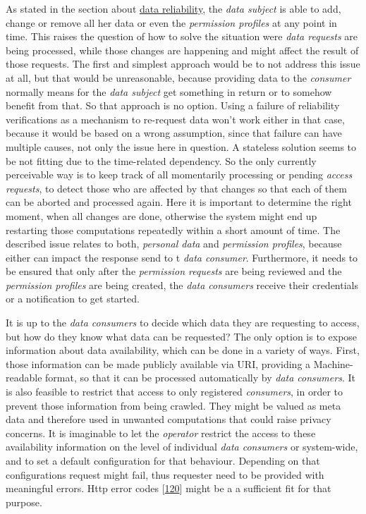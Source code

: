 \documentclass[12pt,english,a4paper,titlepage,cleardoublepage=empty,dottedtoc]{report}
\begin{document}
As stated in the section about \protect\hyperlink{data-reliability}{data
reliability}, the \emph{data subject} is able to add, change or remove
all her data or even the \emph{permission profiles} at any point in
time. This raises the question of how to solve the situation were
\emph{data requests} are being processed, while those changes are
happening and might affect the result of those requests. The first and
simplest approach would be to not address this issue at all, but that
would be unreasonable, because providing data to the \emph{consumer}
normally means for the \emph{data subject} get something in return or to
somehow benefit from that. So that approach is no option. Using a
failure of reliability verifications as a mechanism to re-request data
won't work either in that case, because it would be based on a wrong
assumption, since that failure can have multiple causes, not only the
issue here in question. A stateless solution seems to be not fitting due
to the time-related dependency. So the only currently perceivable way is
to keep track of all momentarily processing or pending \emph{access
requests}, to detect those who are affected by that changes so that each
of them can be aborted and processed again. Here it is important to
determine the right moment, when all changes are done, otherwise the
system might end up restarting those computations repeatedly within a
short amount of time. The described issue relates to both,
\emph{personal data} and \emph{permission profiles}, because either can
impact the response send to t \emph{data consumer}. Furthermore, it
needs to be ensured that only after the \emph{permission requests} are
being reviewed and the \emph{permission profiles} are being created, the
\emph{data consumers} receive their credentials or a notification to get
started.

It is up to the \emph{data consumers} to decide which data they are
requesting to access, but how do they know what data can be requested?
The only option is to expose information about data availability, which
can be done in a variety of ways. First, those information can be made
publicly available via URI, providing a Machine-readable format, so that
it can be processed automatically by \emph{data consumers}. It is also
feasible to restrict that access to only registered \emph{consumers}, in
order to prevent those information from being crawled. They might be
valued as meta data and therefore used in unwanted computations that
could raise privacy concerns. It is imaginable to let the
\emph{operator} restrict the access to these availability information on
the level of individual \emph{data consumers} or system-wide, and to set
a default configuration for that behaviour. Depending on that
configurations request might fail, thus requester need to be provided
with meaningful errors. Http error codes
{[}\protect\hyperlink{ref-web_spec_http-error-codes}{120}{]} might be a
a sufficient fit for that purpose.
\end{document}
